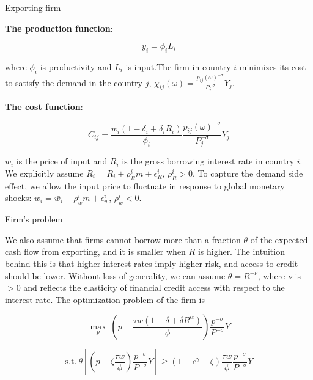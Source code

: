\documentclass[10pt]{beamer}
\begin{document}
\begin{frame}{Exporting firm}

\textbf{The production function}:

$$
y_i= \phi_i L_i
$$

where $\phi_i$ is productivity and $L_i$ is input.The firm in country $i$ minimizes its cost to satisfy the demand in the country $j$, $\chi_{ij}(\omega)=\frac{p_{ij}(\omega)^{-\sigma}}{P_j^{-\sigma}} Y_j$.
\vfill

\textbf{The cost function}:

$$
C_{ij}=\frac{w_i(1-\delta_i+\delta_i R_i)}{\phi_i} \frac{p_{ij}(\omega)^{-\sigma}}{P_j^{-\sigma}} Y_j
$$ 

$w_i$ is the price of input and $R_i$ is the gross borrowing interest rate in country $i$. We explicitly assume $R_i=\bar{R_i}+\rho_R^i m+\epsilon_R^i$, $\rho_R^i>0$. To capture the demand side effect, we allow the input price to fluctuate in response to global monetary shocks: $w_i=\bar{w_i}+\rho_w^i m + \epsilon_w^i$, $\rho_w^i<0$.

\end{frame}




\begin{frame}{Firm's problem}

We also assume that firms cannot borrow more than a fraction $\theta$ of the expected cash flow from exporting, and it is smaller when $R$ is higher. The intuition behind this is that higher interest rates imply higher risk, and access to credit should be lower. Without loss of generality, we can assume $\theta=R^{-\nu}$, where $\nu$ is $>0$ and reflects the elasticity of financial credit access with respect to the interest rate. The optimization problem of the firm is 

$$
\max_{p} \ (p- \frac{\tau w(1-\delta+\delta R^\alpha)}{\phi}) \frac{p^{-\sigma}}{P^{-\sigma}} Y
$$

\begin{equation}
\text{s.t.} \ \theta [(p-\zeta \frac{\tau w}{\phi}) \frac{p^{-\sigma}}{P^{-\sigma}} Y]\geq(1-c^\gamma-\zeta)\frac{\tau w}{\phi} \frac{p^{-\sigma}}{P^{-\sigma}} Y
\end{equation}

\end{frame}
\end{document}
